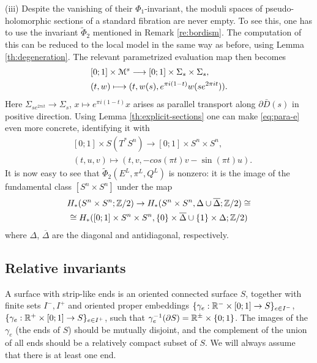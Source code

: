 \documentclass[10pt,letterpaper]{article}
\begin{document}
\begin{remarks}
(iii) Despite the vanishing of their $\Phi_1$-invariant, the moduli spaces of
pseudo-holomorphic sections of a standard fibration are never empty. To see
this, one has to use the invariant $\tilde{\Phi}_2$ mentioned in Remark
\ref{re:bordism}. The computation of this can be reduced to the local model in
the same way as before, using Lemma \ref{th:degeneration}. The relevant
parametrized evaluation map then becomes
\begin{equation} \label{eq:para-e}
\begin{split}
 & [0;1] \times \mathcal{M}^s \longrightarrow [0;1] \times
\Sigma_s \times \Sigma_s, \\
 & (t,w) \longmapsto (t,w(s),e^{\pi i(1-t)} w(s e^{2\pi i t})).
\end{split}
\end{equation}
Here $\Sigma_{s e^{2\pi i t}} \rightarrow \Sigma_s$, $x \mapsto e^{\pi
i(1-t)}x$ arises as parallel transport along $\partial\bar{D}(s)$ in positive
direction. Using Lemma \ref{th:explicit-sections} one can make
\eqref{eq:para-e} even more concrete, identifying it with
\begin{align*}
 & [0;1] \times S(T^*S^n) \longrightarrow [0;1] \times S^n \times S^n, \\
 & (t,u,v) \longmapsto (t,v,-cos(\pi t)v - \sin(\pi t)u).
\end{align*}
It is now easy to see that $\tilde{\Phi}_2(E^L,\pi^L,Q^L)$ is nonzero: it is
the image of the fundamental class $[S^n \times S^n]$ under the map
\begin{multline*}
H_*(S^n \times S^n;\mathbb{Z}/2) \rightarrow H_*(S^n \times S^n, \Delta \cup
\overline{\Delta};\mathbb{Z}/2) \cong \\ \cong H_*([0;1] \times S^n \times S^n, \{0\}
\times \overline{\Delta} \cup \{1\} \times \Delta;\mathbb{Z}/2)
\end{multline*}
where $\Delta$, $\overline{\Delta}$ are the diagonal and antidiagonal,
respectively.
\end{remarks}

%

\subsection{Relative invariants\label{sec:relative-invariants}}

A surface with strip-like ends is an oriented connected surface $S$, together
with finite sets $I^-,I^+$ and oriented proper embeddings $\{\gamma_e: \mathbb{R}^-
\times [0;1] \rightarrow S\}_{e \in I^-}$, $\{\gamma_e: \mathbb{R}^+ \times [0;1]
\rightarrow S\}_{e \in I^+}$, such that $\gamma_e^{-1}(\partial S) = \mathbb{R}^{\pm}
\times \{0;1\}$. The images of the $\gamma_e$ (the ends of $S$) should be
mutually disjoint, and the complement of the union of all ends should be a
relatively compact subset of $S$. We will always assume that there is at least
one end.
\end{document}
